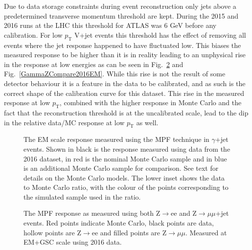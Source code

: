 Due to data storage constraints during event reconstruction only jets above a predetermined transverse momentum threshold are kept.  
During the 2015 and 2016 runs at the LHC this threshold for ATLAS was 6 GeV before any calibration.  
For low $p_{\mathrm T}$ V+jet events this threshold has the effect of removing all events where the jet response happened to have fluctuated low.  
This biases the measured response to be higher than it is in reality leading to an unphysical rise in the response at low energies as can be seen in Fig.~\ref{eemumuCompare2016EM} and Fig.~\ref{GammaZCompare2016EM}.  
While this rise is not the result of some detector behaviour it is a feature in the data to be calibrated, and as such is the correct shape of the calibration curve for this dataset.  
This rise in the measured response at low $p_{\mathrm T}$, combined with the higher response in Monte Carlo and the fact that the reconstruction threshold is at the uncalibrated scale, lead to the dip in the relative data/MC response at low $p_{\mathrm T}$ as well.  


\begin{figure}[!ht]
 \begin{center}
 \end{center}
 \caption[EM scale response using $\gamma$+jet in 2016]
 {\small The EM scale response measured using the MPF technique in $\gamma$+jet events.  Shown in black is the response measured using data from the 2016 dataset, in red is the nominal Monte Carlo sample and in blue is an additional Monte Carlo sample for comparison.  See text for details on the Monte Carlo models.  The lower inset shows the data to Monte Carlo ratio, with the colour of the points corresponding to the simulated sample used in the ratio.  }
 \label{Fig:GammaJetEM2016}
\end{figure}


\begin{figure}[!ht]
  \begin{center}
  \end{center}
  \caption[Comparing EM scale response between Z$\rightarrow$ee and Z$\rightarrow\mu\mu$]
  {\small The MPF response as measured using both Z$\rightarrow$ee and Z$\rightarrow\mu\mu$+jet events.  Red points indicate Monte Carlo, black points are data, hollow points are Z$\rightarrow$ee and filled points are Z$\rightarrow\mu\mu$.  Measured at EM+GSC scale using 2016 data.  }
  \label{eemumuCompare2016EM}
\end{figure}

